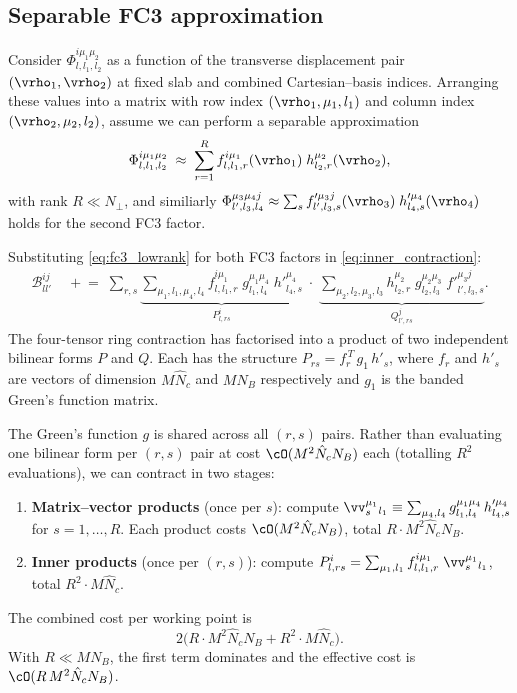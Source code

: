 \subsection{Separable FC3 approximation}
\label{sub:separable}

Consider $\Phi^{i\mu_1\mu_2}_{l,l_1,l_2}$ as a function of the
transverse displacement pair $(\vrho_1,\vrho_2)$ at fixed slab and
combined Cartesian--basis indices.  Arranging these values into a
matrix with row index $(\vrho_1, \mu_1, l_1)$ and column index
$(\vrho_2, \mu_2, l_2)$, assume we can perform a separable
approximation
\begin{equation}
  \Phi^{i\mu_1\mu_2}_{l,l_1,l_2}
  \;\approx\;
  \sum_{r=1}^{R}
  f^{i\mu_1}_{l,l_1,r}(\vrho_1)\;h^{\mu_2}_{l_2,r}(\vrho_2),
  \label{eq:fc3_lowrank}
\end{equation}
with rank $R \ll N_\perp$, and similiarly
$\Phi^{\mu_3\mu_4 j}_{l',l_3,l_4} \approx \sum_s
  f'^{\mu_3 j}_{l',l_3,s}(\vrho_3)\;h'^{\mu_4}_{l_4,s}(\vrho_4)$
holds for the second FC3 factor.

Substituting \cref{eq:fc3_lowrank} for both FC3 factors in
\cref{eq:inner_contraction}:
\begin{align}
  \mathcal{B}^{ij}_{ll'}
  &\;\mathrel{+}=\;
  \sum_{r,s}
  \underbrace{
    \sum_{\mu_1,l_1,\mu_4,l_4}
    f^{i\mu_1}_{l,l_1,r}\;g^{\mu_1\mu_4}_{l_1,l_4}\;
    h'^{\mu_4}_{l_4,s}
  }_{P^i_{l,rs}}
  \;\cdot\;
  \underbrace{
    \sum_{\mu_2,l_2,\mu_3,l_3}
    h^{\mu_2}_{l_2,r}\;g^{\mu_2\mu_3}_{l_2,l_3}\;
    f'^{\mu_3 j}_{l',l_3,s}
  }_{Q^j_{l',rs}}.
  \label{eq:sep_split}
\end{align}
The four-tensor ring contraction has factorised into a product of
two independent bilinear forms $P$ and $Q$.  Each has the
structure $P_{rs} = f_r^{\,T}\,g_1\,h'_s$,  where
$f_r$ and $h'_s$ are vectors of dimension $M\hat{N}_c$ and $MN_B$
respectively and $g_1$ is the banded Green's function matrix.

The Green's function $g$ is shared across all $(r,s)$ pairs.
Rather than evaluating one bilinear form per $(r,s)$ pair at cost
$\cO(M^2\hat{N}_c N_B)$ each (totalling $R^2$ evaluations), we
can contract in two stages:
\begin{enumerate}
  \item\textbf{Matrix--vector products} (once per $s$):
    compute
    $\vv_s^{\mu_1}{}_{l_1}
      \equiv \sum_{\mu_4,l_4}
      g^{\mu_1\mu_4}_{l_1,l_4}\,h'^{\mu_4}_{l_4,s}$
    for $s = 1,\ldots,R$.
    Each product costs
    $\cO(M^2\hat{N}_c N_B)$, total $R\cdot M^2\hat{N}_c N_B$.
  \item\textbf{Inner products} (once per $(r,s)$):
    compute $P^i_{l,rs} = \sum_{\mu_1,l_1}
      f^{i\mu_1}_{l,l_1,r}\;\vv_s^{\mu_1}{}_{l_1}$,
    total $R^2\cdot M\hat{N}_c$.
\end{enumerate}
The combined cost per working point is
\begin{equation}
  2\bigl(R\cdot M^2\hat{N}_c N_B
        + R^2\cdot M\hat{N}_c\bigr).
  \label{eq:cost_opt}
\end{equation}
With $R \ll MN_B$, the first term dominates and the
effective cost is $\cO(R\,M^2\hat{N}_c N_B)$.

